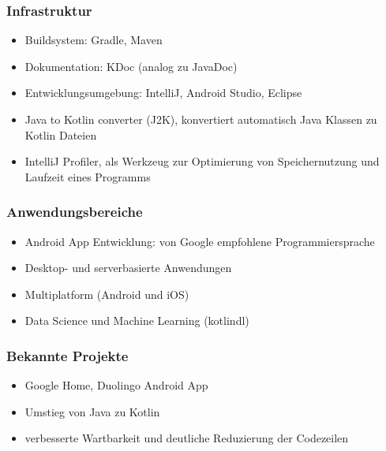 \documentclass{beamer}
\begin{document}
\begin{frame}
\frametitle{Infrastruktur}
\begin{itemize}
\onehalfspacing
    \item Buildsystem: Gradle, Maven
    \item Dokumentation: KDoc (analog zu JavaDoc)
    \item Entwicklungsumgebung: IntelliJ, Android Studio, Eclipse
    \item Java to Kotlin converter (J2K), konvertiert automatisch Java Klassen zu Kotlin Dateien
    \item IntelliJ Profiler, als Werkzeug zur Optimierung von Speichernutzung und Laufzeit eines Programms
\end{itemize}
\end{frame}

\begin{frame}
\frametitle{Anwendungsbereiche}
\begin{itemize}
\onehalfspacingy
    \item Android App Entwicklung: von Google empfohlene Programmiersprache
    \item Desktop- und serverbasierte Anwendungen
    \item Multiplatform (Android und iOS)
    \item Data Science und Machine Learning (kotlindl)
\end{itemize}
\end{frame}

\begin{frame}
\frametitle{Bekannte Projekte}
\begin{itemize}
\onehalfspacing
    \item Google Home, Duolingo Android App
    \item Umstieg von Java zu Kotlin
    \item verbesserte Wartbarkeit und deutliche Reduzierung der Codezeilen
\end{itemize}
\end{frame}
\end{document}
